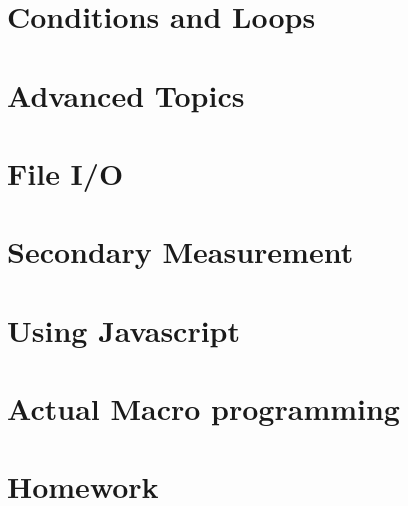 \documentclass[11pt,a4paper,oneside]{report}
\begin{document}
	
	
	
	
	

\section{Conditions and Loops}
	
		
		

\section{Advanced Topics}
\label{sec:advancedTopics}

  
  
  
  
  
  
  
  

\section{File I/O}

	
	
	
	

\section{Secondary Measurement}
	

\section{Using Javascript}
	

\section{Actual Macro programming}
	

\section{Homework}
	
\end{document}
